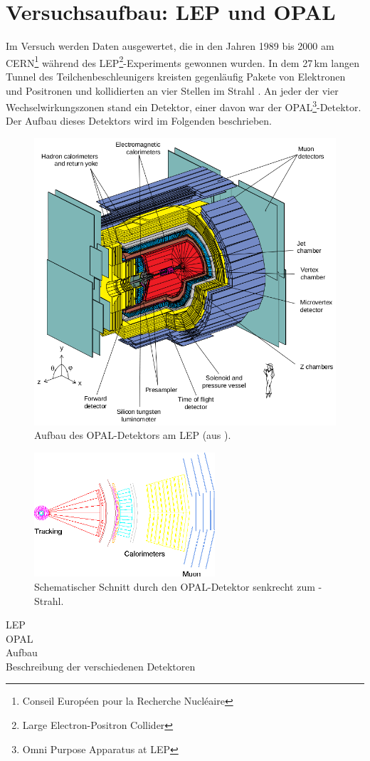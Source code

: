 \section{Versuchsaufbau: LEP und OPAL}
Im Versuch werden Daten ausgewertet, die in den Jahren 1989 bis 2000 am
CERN\footnote{Conseil Européen pour la Recherche Nucléaire} während des
LEP\footnote{Large Electron-Positron Collider}-Experiments gewonnen wurden.
In dem 27\,km langen Tunnel des Teilchenbeschleunigers kreisten gegenläufig Pakete von Elektronen und Positronen
und kollidierten an vier Stellen im Strahl \cite{manual}.
An jeder der vier Wechselwirkungszonen stand ein Detektor, einer davon war der
OPAL\footnote{Omni Purpose Apparatus at LEP}-Detektor.
Der Aufbau dieses Detektors wird im Folgenden beschrieben.

\begin{figure}[H]
\begin{center}
  \includegraphics[width=\textwidth]{../img/aufbau.png}
  \caption{Aufbau des OPAL-Detektors am LEP (aus \cite{manualmuc}).}
  \label{img:aufbau}
\end{center}
\end{figure} 

\begin{figure}[H]
\begin{center}
  \includegraphics[width=0.6\textwidth]{../img/opalslice_tr.png}
  \caption{Schematischer Schnitt durch den OPAL-Detektor senkrecht zum \ee-Strahl.}
  \label{img:schnitt}
\end{center}
\end{figure} 


LEP\\
OPAL \\
Aufbau \\
Beschreibung der verschiedenen Detektoren 